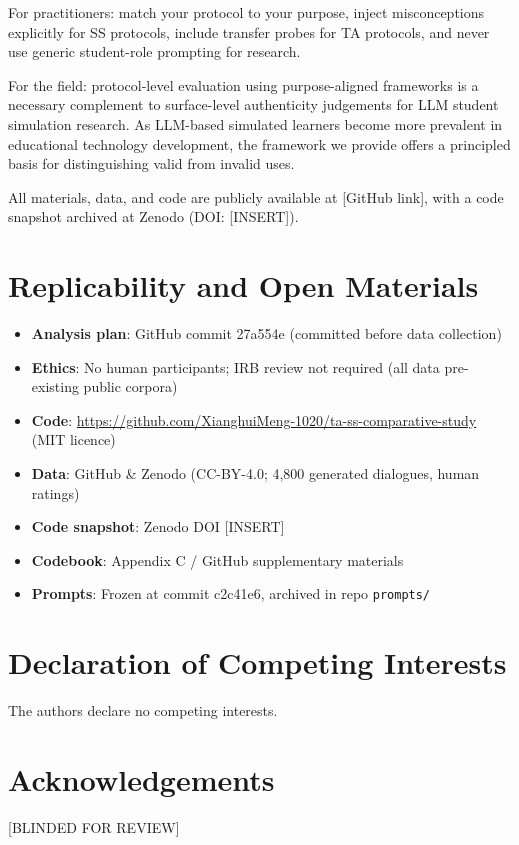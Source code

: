 \documentclass[12pt]{article}
\begin{document}
For practitioners: match your protocol to your purpose, inject misconceptions explicitly
for SS protocols, include transfer probes for TA protocols, and never use generic
student-role prompting for research.

For the field: protocol-level evaluation using purpose-aligned frameworks is a necessary
complement to surface-level authenticity judgements for LLM student simulation research.
As LLM-based simulated learners become more prevalent in educational technology development,
the framework we provide offers a principled basis for distinguishing valid from invalid uses.

All materials, data, and code are publicly available at [GitHub link],
with a code snapshot archived at Zenodo (DOI: [INSERT]).

\section*{Replicability and Open Materials}

\begin{itemize}
  \item \textbf{Analysis plan}: GitHub commit 27a554e (committed before data collection)
  \item \textbf{Ethics}: No human participants; IRB review not required (all data pre-existing public corpora)
  \item \textbf{Code}: \url{https://github.com/XianghuiMeng-1020/ta-ss-comparative-study} (MIT licence)
  \item \textbf{Data}: GitHub \& Zenodo (CC-BY-4.0; 4,800 generated dialogues, human ratings)
  \item \textbf{Code snapshot}: Zenodo DOI [INSERT]
  \item \textbf{Codebook}: Appendix C / GitHub supplementary materials
  \item \textbf{Prompts}: Frozen at commit c2c41e6, archived in repo \texttt{prompts/}
\end{itemize}

\section*{Declaration of Competing Interests}

The authors declare no competing interests.

\section*{Acknowledgements}

[BLINDED FOR REVIEW]



\end{document}
